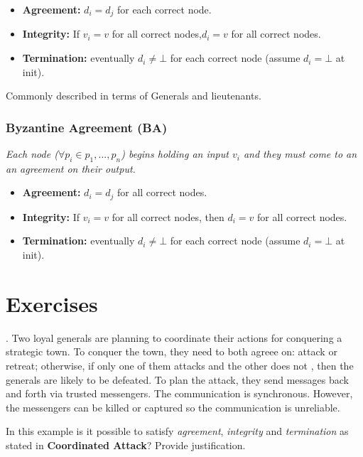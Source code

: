 \documentclass[12pt]{article}
\newcounter{question}
\newcommand{\question}[1]{
    \stepcounter{question}
    \thequestion. #1 \hfill
}
\begin{document}
\begin{itemize}
    \item \textbf{Agreement: } $d_i = d_j$ for each correct node.
    \item \textbf{Integrity: } If $v_i = v$ for all correct nodes,$d_i = v$ for all correct nodes.
    \item \textbf{Termination: } eventually $d_i \not = \bot$ for each correct node (assume $d_i = \bot$ at init).
\end{itemize}

Commonly described in terms of Generals and lieutenants.

\subsubsection*{Byzantine Agreement (BA)}

\begin{center}
    \textit{Each node ($\forall p_i \in {p_1, ..., p_n}$) begins holding an input $v_i$ and they must come to an an agreement on their output.}
\end{center}

\begin{itemize}
    \item \textbf{Agreement: } $d_i = d_j$ for all correct nodes.
    \item \textbf{Integrity: } If $v_i = v$ for all correct nodes, then $d_i = v$ for all correct nodes.
    \item \textbf{Termination: } eventually $d_i \not = \bot$ for each correct node (assume $d_i = \bot$ at init).
\end{itemize}

\pagebreak

\section*{Exercises}

\setcounter{question}{35}

\question{Two loyal generals are planning to coordinate their actions for conquering a strategic town. To conquer the town, they need to both agreee on: attack or retreat; otherwise, if only one of them attacks and the other does not , then the generals are likely to be defeated. To plan the attack, they send messages back and forth via trusted messengers. The communication is synchronous. However, the messengers can be killed or captured so the communication is unreliable.


In this example is it possible to satisfy \textit{agreement}, \textit{integrity} and \textit{termination} as stated in \textbf{Coordinated Attack}? Provide justification.}
\end{document}
